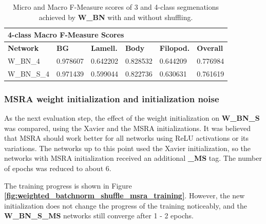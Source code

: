 \begin {table}
\begin{flushleft}
\begin {tabular}[!htb]{|l|l|l|l|l|l|}
			\multicolumn{6}{|l|}{\textbf{4-class Macro F-Measure Scores}} \\ \hline
			\textbf{Network}& \textbf{BG}& \textbf{Lamell.}& \textbf{Body}& \textbf{Filopod.}& \textbf{Overall} \\ \hline
			W\_BN\_4& \cellcolor{green!25}0.978607& \cellcolor{green!25}0.642202& \cellcolor{green!25}0.828532& \cellcolor{green!25}0.644209& \cellcolor{green!25}0.776984 \\ \hline
			W\_BN\_S\_4& 0.971439& 0.599044& 0.822736& 0.630631& 0.761619 \\ \hline
		\end {tabular}
	\end {flushleft}

\caption[Micro and Macro F-Measure scores for a network with Batch Normalization and with or without shuffling.]{Micro and Macro F-Measure scores of 3 and 4-class segmenations achieved by \textbf{W\_BN} with and without shuffling.}
\label{tab:results3}
\end {table}


	\subsubsection {MSRA weight initialization and initialization noise}

\noindent As the next evaluation step, the effect of the weight initialization on \textbf{W\_BN\_S} was compared, using the Xavier and the MSRA initializations. It was believed that MSRA should work better for all networks using ReLU activations or its variations. The networks up to this point used the Xavier initialization, so the networks with MSRA initialization received an additional \textbf{\_MS} tag. The number of epochs was reduced to about 6.

The training progress is shown in Figure \textbf{\ref{fig:weighted_batchnorm_shuffle_msra_training}}. However, the new initialization does not change the progress of the training noticeably, and the \textbf{W\_BN\_S\_MS} networks still converge after 1 - 2 epochs.\\


